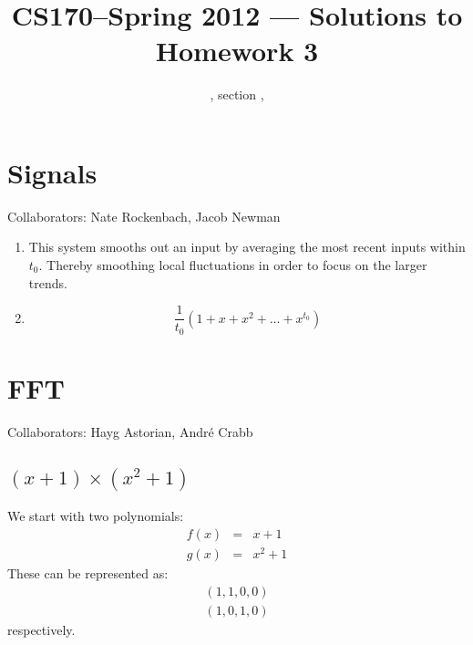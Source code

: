 \documentclass[11pt]{article}
\title{CS170--Spring 2012 --- Solutions to Homework 3}
\author{\Name, section \Sec, \texttt{\Login}}
\begin{document}
\maketitle

\section{Signals}
Collaborators: Nate Rockenbach, Jacob Newman

\begin{enumerate}
\item 
This system smooths out an input by averaging the most recent inputs within
$t_0$. Thereby smoothing local fluctuations in order to focus on the larger
trends.
\item
\begin{equation*}
\frac{1}{t_0}\left( 1 + x + x^2 + \dots + x^{t_0} \right)
\end{equation*}
\end{enumerate}
\newpage
\section{FFT}
Collaborators: Hayg Astorian, Andr\'e Crabb
\subsection{$(x+1) \times (x^2 + 1)$ }
We start with two polynomials:
\begin{eqnarray*}
f(x) &=&  x + 1\\
g(x) &=& x^2 + 1
\end{eqnarray*}
These can be represented as:
\begin{eqnarray*}
(1, 1, 0, 0)\\
(1, 0, 1, 0)
\end{eqnarray*}
respectively.
\end{document}
